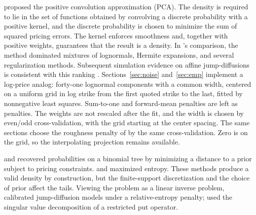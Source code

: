 \documentclass[preprint,12pt,authoryear,times]{elsarticle}
\begin{document}
\citet{bondarenko2003} proposed the positive convolution approximation (PCA). The density is required to lie in the set of functions obtained by convolving a discrete probability with a positive kernel, and the discrete probability is chosen to minimize the sum of squared pricing errors. The kernel enforces smoothness and, together with positive weights, guarantees that the result is a density. In \citeauthor{bondarenko2003}'s comparison, the method dominated mixtures of lognormals, Hermite expansions, and several regularization methods. Subsequent simulation evidence on affine jump-diffusions is consistent with this ranking \citep{lu2019}. Sections~\ref{sec:noise} and~\ref{sec:emp} implement a log-price analog: forty-one lognormal components with a common width, centered on a uniform grid in log strike from the first quoted strike to the last, fitted by nonnegative least squares. Sum-to-one and forward-mean penalties are left as penalties. The weights are not rescaled after the fit, and the width is chosen by even/odd cross-validation, with the grid starting at the center spacing. The same sections choose the roughness penalty of \citeauthor{yatchew2006} by the same cross-validation. Zero is on the grid, so the interpolating projection remains available.

\citet{rubinstein1994} and \citet{jackwerth1996} recovered probabilities on a binomial tree by minimizing a distance to a prior subject to pricing constraints. \citet{stutzer1996} and \citet{buchen1996} maximized entropy. These methods produce a valid density by construction, but the finite-support discretization and the choice of prior affect the tails. Viewing the problem as a linear inverse problem, \citet{cont2004} calibrated jump-diffusion models under a relative-entropy penalty; \citet{monnier2014} used the singular value decomposition of a restricted put operator.
\end{document}
